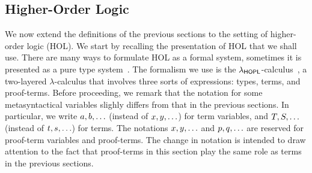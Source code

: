 
\newcommand{\OLD}[1]{\textcolor{red}{#1 \text{\,\,(!!!deprecated!!!)}}}
\renewcommand{\tm}{\OLD{\origtm}}
\renewcommand{\tmtwo}{\OLD{\origtmtwo}}
\renewcommand{\tmthree}{\OLD{\origtmthree}}
\renewcommand{\var}{\OLD{\origvar}}
\renewcommand{\vartwo}{\OLD{\origvartwo}}
\renewcommand{\varthree}{\OLD{\origvarthree}}
\renewcommand{\lam}[2]{\OLD{\origlam{#1}{#2}}}
\renewcommand{\judg}[3]{\OLD{\origjudg{#1}{#2}{#3}}}

\subsection{Higher-Order Logic}

We now extend the definitions of the previous sections
to the setting of higher-order logic (HOL).
We start by recalling the presentation of HOL that we shall use.
There are many ways to formulate HOL as a formal system,
\eg sometimes it is presented as a pure type system~\cite{Geuvers95}.
The formalism we use is the ${\lambda}_{\mathsf{HOPL}}$-calculus~\cite{Geuvers95},
a two-layered $\lambda$-calculus that involves three sorts of expressions:
types, terms, and proof-terms.
Before proceeding, we remark that the notation for some metasyntactical variables
slighly differs from that in the previous sections.
In particular,
we write $a,b,\hdots$ (instead of $x,y,\hdots$) for term variables,
and $T,S,\hdots$ (instead of $t,s,\hdots$) for terms.
The notations $x,y,\hdots$ and $p,q,\hdots$
are reserved for proof-term variables and proof-terms.
The change in notation is intended to draw attention to the fact that proof-terms
in this section play the same role as terms in the previous sections.


